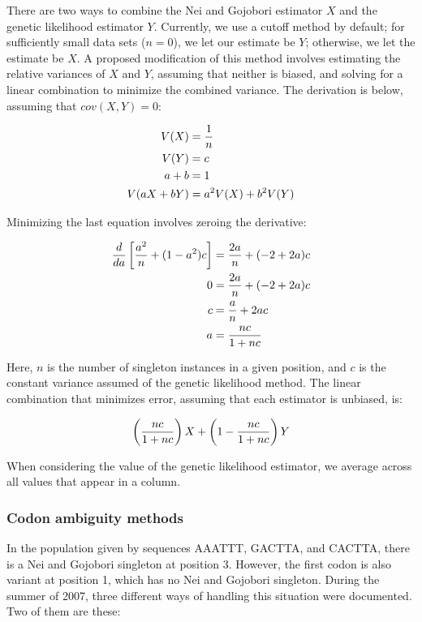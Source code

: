\documentclass{article}
\begin{document}
	There are two ways to combine the Nei and Gojobori estimator $X$ and the
	genetic likelihood estimator $Y$. Currently, we use a cutoff method by
	default; for sufficiently small data sets ($n = 0$), we let our estimate
	be $Y$; otherwise, we let the estimate be $X$. A proposed modification
	of this method involves estimating the relative variances of $X$ and
	$Y$, assuming that neither is biased, and solving for a linear
	combination to minimize the combined variance. The derivation is below,
	assuming that $cov(X, Y) = 0$:

	\begin{align*}
	  V(X)		& = {1 \over n} \\ %
	  V(Y)		& = c \\ %
	  a + b 	& = 1 \\ %
	  V(aX + bY)	& = a^2 V(X) + b^2 V(Y)
	\end{align*}

	Minimizing the last equation involves zeroing the derivative:

	\begin{align*}
	  {d \over da} \left[{a^2 \over n} + (1 - a^2) c\right]
	    & = {2a \over n} + (-2 + 2a) c \\ %
	  0 & = {2a \over n} + (-2 + 2a) c \\ %
	  c & = {a \over n} + 2ac \\ %
	  a & = {nc \over 1 + nc}
	\end{align*}

	Here, $n$ is the number of singleton instances in a given position, and
	$c$ is the constant variance assumed of the genetic likelihood method.
	The linear combination that minimizes error, assuming that each
	estimator is unbiased, is:

	$$ \left( {nc \over 1 + nc} \right) X + \left (1 - {nc \over 1 +
	    nc}\right) Y $$

	When considering the value of the genetic likelihood estimator, we
	average across all values that appear in a column.

      \subsubsection{Codon ambiguity methods}
	\label{sec:codon-ambiguity}

	In the population given by sequences AAATTT, GACTTA, and CACTTA,
	there is a Nei and Gojobori singleton at position 3. However, the first codon
	is also variant at position 1, which has no Nei and Gojobori singleton.
	During the summer of 2007, three different ways of handling this situation were
	documented. Two of them are these:
\end{document}
